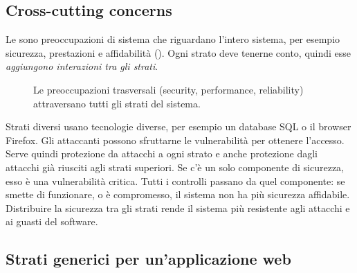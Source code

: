 \subsection{Cross-cutting concerns}

Le  sono preoccupazioni di sistema che riguardano l'intero sistema, per esempio
sicurezza, prestazioni e affidabilità (). Ogni strato deve tenerne conto, quindi esse
\emph{aggiungono interazioni tra gli strati}.

\begin{figure}[ht]
\centering
{}
\caption{Le preoccupazioni trasversali (security, performance, reliability) attraversano tutti gli strati del sistema.}
\label{fig:arch-trasversali}
\end{figure}

\begin{esempio}
Strati diversi usano tecnologie diverse, per esempio un database SQL o il browser Firefox. Gli attaccanti possono
sfruttarne le vulnerabilità per ottenere l'accesso. Serve quindi protezione da attacchi a ogni strato e anche
protezione dagli attacchi già riusciti agli strati superiori. Se c'è un solo componente di sicurezza, esso è una
vulnerabilità critica. Tutti i controlli passano da quel componente: se smette di funzionare, o è compromesso, il
sistema non ha più sicurezza affidabile. Distribuire la sicurezza tra gli strati rende il sistema più resistente agli
attacchi e ai guasti del software.
\end{esempio}

\subsection{Strati generici per un'applicazione web}

